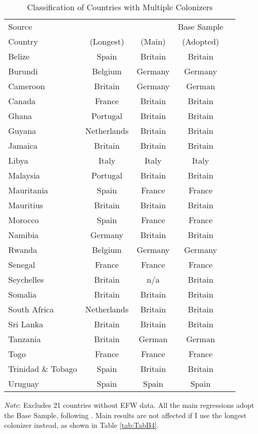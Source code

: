 \begin{table}[h!]
\centering
\begin{threeparttable}
\caption{Classification of Countries with Multiple Colonizers}\label{tab:classification}
\begin{tabular*}{\textwidth}{@{\extracolsep{\fill}}lcccc@{\extracolsep{\fill}}}
\hline
\hline
Source & \cite{COLDAT} & \cite{laporta1999quality} & Base Sample \\
Country & (Longest)  &   (Main) &  (Adopted) \\
\hline
Belize     &    Spain          & Britain    &  Britain \\
 Burundi   &    Belgium    &     Germany     &  Germany  \\
 Cameroon  &     Britain    &    Germany    & German  \\
 Canada   &     France      &    Britain   & Britain \\
Ghana   &   Portugal       &   Britain  & Britain \\
Guyana  & Netherlands    &      Britain  & Britain \\
Jamaica   &    Britain     &     Britain  & Britain \\
Libya      &   Italy      &     Italy  & Italy \\
Malaysia    &  Portugal   &       Britain & Britain\\
Mauritania  &       Spain   &   France    & France \\  
Mauritius  &     Britain   &       Britain &  Britain \\
Morocco   &      Spain     &     France    & France \\     
Namibia   &    Germany     &    Britain  & Britain \\
Rwanda    &   Belgium     &     Germany &  Germany  \\
Senegal   &     France    &      France  &  France \\          
Seychelles  &     Britain   &       n/a & Britain \\
Somalia   &    Britain      &    Britain & Britain  \\
South Africa  & Netherlands  &    Britain   & Britain \\
Sri Lanka   &    Britain     &     Britain &  Britain \\
Tanzania   &    Britain      &    German   & German  \\
Togo     &   France    &      France       & France \\
Trinidad \& Tobago     &    Spain    & Britain   & Britain\\
Uruguay     &    Spain     &     Spain   & Spain \\  
\bottomrule
\end{tabular*}
\begin{tablenotes}
\small
\item \textit{Note}:  Excludes 21 countries without EFW data. All the main regressions adopt the Base Sample, following \cite{laporta1999quality}. Main results are not affected if I use the longest colonizer instead, as shown in Table \ref{tab:TabB4}.
\end{tablenotes}
\end{threeparttable}
\end{table}